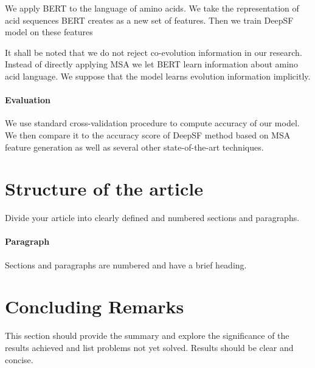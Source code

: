 \documentclass[12pt, twoside]{article}
\begin{document}
We apply BERT to the language of amino acids. We take the representation of acid sequences BERT creates as a new set of features. Then we train DeepSF model on these features

It shall be noted that we do not reject co-evolution information in our research. Instead of directly applying MSA we let BERT learn information about amino acid language. We suppose that the model learns evolution information implicitly.

\paragraph{Evaluation}
\noindent
We use standard cross-validation procedure to compute accuracy of our model. We then compare it to the accuracy score of DeepSF method based on MSA feature generation as well as several other state-of-the-art techniques. 

\section{Structure of the article}
\noindent
Divide your article into clearly defined and numbered sections and paragraphs.

\paragraph{Paragraph}
\noindent
Sections and paragraphs are numbered and have a brief heading.

\section{Concluding Remarks}
This section should provide the summary and explore the significance of the results achieved and list problems not yet solved.
Results should be clear and concise. 







\end{document}
